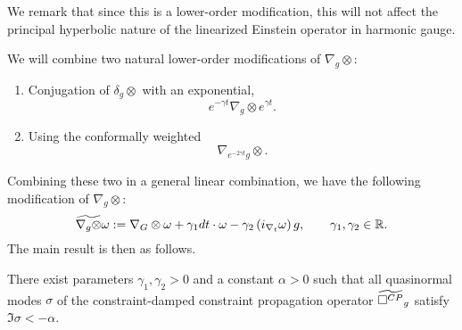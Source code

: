 \documentclass{article}
\begin{document}
We remark that since this is a lower-order modification, this will not
affect the principal hyperbolic nature of the linearized Einstein
operator in harmonic gauge.

We will combine two natural lower-order modifications of $\nabla_g\otimes$:
\begin{enumerate}
\item Conjugation of $\delta_g\otimes$ with an exponential,
  \begin{equation*}
    e^{-\gamma t}\nabla_g\otimes e^{\gamma t}.
  \end{equation*}
\item Using the conformally weighted
  \begin{equation*}
    \nabla_{e^{-2\gamma t}g}\otimes.
  \end{equation*}
\end{enumerate}
Combining these two in a general linear combination, we have the
following modification of $\nabla_g\otimes$:
\begin{equation*}
  \widetilde{\nabla_g\otimes}\omega
  := \nabla_G\otimes\omega
  + \gamma_1 dt\cdot \omega
  - \gamma_2 \left(i_{\nabla_t}\omega\right)g, \qquad
  \gamma_1,\gamma_2 \in \mathbb{R}.
\end{equation*}
The main result is then as follows.
\begin{theorem}
  There exist parameters $\gamma_1,\gamma_2>0$ and a constant
  $\alpha>0$ such that all quasinormal modes $\sigma$ of the
  constraint-damped constraint propagation operator
  $\widetilde{\Box^{CP}}_g$ satisfy
  $\Im\sigma<-\alpha$.
\end{theorem}
\end{document}
